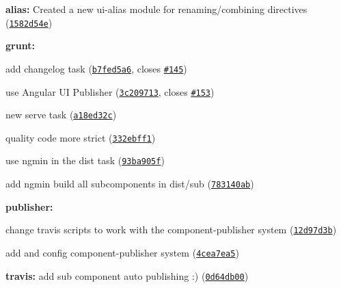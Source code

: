 \begin{DoxyItemize}
\item {\bfseries alias\+:} Created a new ui-\/alias module for renaming/combining directives (\href{http://github.com/angular-ui/ui-utils/commit/1582d54ecaf81cb516a28368c0d409b5d5fe7da9}{\tt 1582d54e})
\item {\bfseries grunt\+:}
\begin{DoxyItemize}
\item add \textquotesingle{}changelog\textquotesingle{} task (\href{http://github.com/angular-ui/ui-utils/commit/b7fed5a6026121d0098f892aa0a221c0d9c14d56}{\tt b7fed5a6}, closes \href{http://github.com/angular-ui/ui-utils/issues/145}{\tt \#145})
\item use Angular UI Publisher (\href{http://github.com/angular-ui/ui-utils/commit/3c20971307e50741f88da21cb638077237e56da2}{\tt 3c209713}, closes \href{http://github.com/angular-ui/ui-utils/issues/153}{\tt \#153})
\item new \textquotesingle{}serve\textquotesingle{} task (\href{http://github.com/angular-ui/ui-utils/commit/a18ed32ce134acabe7adc79b41e82ed6c52109ed}{\tt a18ed32c})
\item quality code more strict (\href{http://github.com/angular-ui/ui-utils/commit/332ebff1fdc7edf4d44d64f4796ec2f70e90947f}{\tt 332ebff1})
\item use ngmin in the \textquotesingle{}dist\textquotesingle{} task (\href{http://github.com/angular-ui/ui-utils/commit/93ba905fadfd4d0970d384f7978e19a3561cea65}{\tt 93ba905f})
\item add ngmin build all subcomponents in dist/sub (\href{http://github.com/angular-ui/ui-utils/commit/783140abe1b8d6c0f842eceb7fc24a0f16d73ca5}{\tt 783140ab})
\end{DoxyItemize}
\item {\bfseries publisher\+:}
\begin{DoxyItemize}
\item change travis scripts to work with the component-\/publisher system (\href{http://github.com/angular-ui/ui-utils/commit/12d97d3bf88da86875141093fc164f1537d0dfe2}{\tt 12d97d3b})
\item add and config component-\/publisher system (\href{http://github.com/angular-ui/ui-utils/commit/4cea7ea5bb4c47ad74c4f5123121a2896bf6f717}{\tt 4cea7ea5})
\end{DoxyItemize}
\item {\bfseries travis\+:} add sub component auto publishing \+:) (\href{http://github.com/angular-ui/ui-utils/commit/0d64db00a5c50816cbf0b022aa5607fee29d5e2a}{\tt 0d64db00}) 
\end{DoxyItemize}
